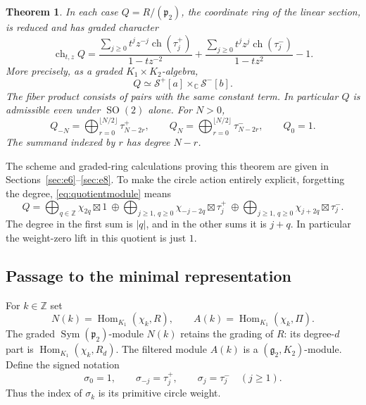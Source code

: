 \documentclass[11pt]{article}
\newcommand{\C}{\mathbb C}
\newcommand{\Z}{\mathbb Z}
\newcommand{\Sym}{\operatorname{Sym}}
\newcommand{\Hom}{\operatorname{Hom}}
\newcommand{\ch}{\operatorname{ch}}
\newcommand{\SO}{\operatorname{SO}}
\newcommand{\fg}{\mathfrak g}
\newcommand{\fp}{\mathfrak p}
\newtheorem{theorem}{Theorem}[section]
\theoremstyle{definition}
\numberwithin{equation}{section}
\begin{document}
\begin{theorem}\label{thm:quotient}
In each case $Q=R/(\fp_2)$, the coordinate ring of the linear section,
is reduced and has graded character
\begin{equation}\label{eq:quotientchar}
 \ch_{t,z}Q=
 \frac{\sum_{j\geq0}t^jz^{-j}\ch(\tau_j^+)}{1-tz^{-2}}
 +\frac{\sum_{j\geq0}t^jz^j\ch(\tau_j^-)}{1-tz^2}-1.
\end{equation}
More precisely, as a graded $K_1\times K_2$-algebra,
\begin{equation}\label{eq:quotientmodule}
 Q\simeq\mathcal S^+[a]\times_\C\mathcal S^-[b].
\end{equation}
The fiber product consists of pairs with the same constant term.
In particular $Q$ is admissible even under $\SO(2)$ alone. For $N>0$,
\begin{equation}\label{eq:forwardgenerators}
 Q_{-N}=\bigoplus_{r=0}^{\lfloor N/2\rfloor}\tau_{N-2r}^+,
 \qquad Q_N=\bigoplus_{r=0}^{\lfloor N/2\rfloor}\tau_{N-2r}^-,
 \qquad Q_0=1.
\end{equation}
The summand indexed by $r$ has degree $N-r$.
\end{theorem}

The scheme and graded-ring calculations proving this theorem are given in
Sections~\ref{sec:e6}--\ref{sec:e8}. To make the circle action entirely
explicit, forgetting the degree, \eqref{eq:quotientmodule} means
\begin{equation}\label{eq:explicitchars}
 Q=\bigoplus_{q\in\Z}\chi_{2q}\boxtimes1
 \ \oplus\!\bigoplus_{j\geq1,\,q\geq0}\chi_{-j-2q}\boxtimes\tau_j^+
 \ \oplus\!\bigoplus_{j\geq1,\,q\geq0}\chi_{j+2q}\boxtimes\tau_j^-.
\end{equation}
The degree in the first sum is $|q|$, and in the other sums it is $j+q$.
In particular the weight-zero lift in this quotient is just $1$.

\subsection{Passage to the minimal representation}
For $k\in\Z$ set
\[
 N(k)=\Hom_{K_1}(\chi_k,R),\qquad
 A(k)=\Hom_{K_1}(\chi_k,\Pi).
\]
The graded $\Sym(\fp_2)$-module $N(k)$ retains the grading of $R$:
its degree-$d$ part is $\Hom_{K_1}(\chi_k,R_d)$. The filtered module
$A(k)$ is a $(\fg_2,K_2)$-module.
Define the signed notation
\begin{equation}\label{eq:sigma}
 \sigma_0=1,\qquad \sigma_{-j}=\tau_j^+,\qquad
 \sigma_j=\tau_j^-\quad(j\geq1).
\end{equation}
Thus the index of $\sigma_k$ is its primitive circle weight.
\end{document}
